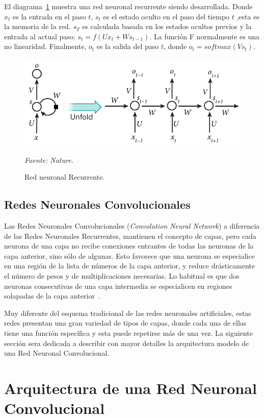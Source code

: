 El diagrama~\ref{fig:rnn} muestra una red neuronal recurrente siendo desarrollada. Donde $x_t$ es la entrada en el paso $t$, $s_t$ es el estado oculto en el paso del tiempo $t$ ,esta es la memoria de la red. $s_T$ es calculada basada en los estados ocultos previos y la entrada al actual paso: $s_t = f(U x_t + W s_{t-1})$. La función F normalmente es una no linearidad. Finalmente, $o_t$ es la salida del paso $t$, donde $o_t = softmax(V s_t)$. 
\begin{figure}[H]
		\centering
		\includegraphics[width=130mm]{Imagenes/rnn.jpg}
		\caption{Red neuronal Recurrente.}
		\vspace{0.15cm}
		\textit{Fuente: Nature.}
		\label{fig:rnn}
\end{figure}
\subsection{Redes Neuronales Convolucionales}
Las Redes Neuronales Convolucionales (\textit{Convolution Neural Network}) a diferencia de las Redes Neuronales Recurrentes, mantienen el concepto de capas, pero cada neurona de una capa no recibe conexiones entrantes de todas las neuronas de la capa anterior, sino sólo de algunas. Esto favorece que una neurona se especialice en una región de la lista de números de la capa anterior, y reduce drásticamente el número de pesos y de multiplicaciones necesarias. Lo habitual es que dos neuronas consecutivas de una capa intermedia se especialicen en regiones solapadas de la capa anterior~\cite{16pusiol2014redes}.

Muy diferente del esquema tradicional de las redes neuronales artificiales, estas redes presentan una gran variedad de tipos de capas, donde cada una de ellas tiene una función específica y esta puede repetirse más de una vez. La siguiente sección sera dedicada a describir con mayor detalles la arquitectura modelo de una Red Neuronal Convolucional.

\section{Arquitectura de una Red Neuronal Convolucional}

